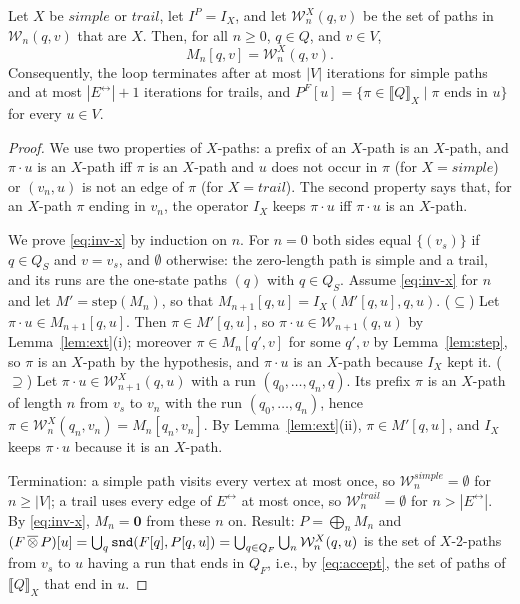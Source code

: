 \begin{theorem}\label{thm:simple-trail}
	Let $X$ be $simple$ or $trail$, let $I^P = I_X$, and let $\mathcal{W}^X_n(q, v)$ be the set of paths in $\mathcal{W}_n(q, v)$ that are $X$. Then, for all $n \geq 0$, $q \in Q$, and $v \in V$,
	\begin{equation}\label{eq:inv-x}
		M_n[q, v] = \mathcal{W}^X_n(q, v).
	\end{equation}
	Consequently, the loop terminates after at most $|V|$ iterations for simple paths and at most $|E^\leftrightarrow| + 1$ iterations for trails, and $P^F[u] = \{ \pi \in \llbracket Q \rrbracket_X \mid \pi \text{ ends in } u \}$ for every $u \in V$.
\end{theorem}
\begin{proof}
	We use two properties of $X$-paths: a prefix of an $X$-path is an $X$-path, and $\pi \cdot u$ is an $X$-path iff $\pi$ is an $X$-path and $u$ does not occur in $\pi$ (for $X = simple$) or $(v_n, u)$ is not an edge of $\pi$ (for $X = trail$).
	The second property says that, for an $X$-path $\pi$ ending in $v_n$, the operator $I_X$ keeps $\pi \cdot u$ iff $\pi \cdot u$ is an $X$-path.

	We prove \eqref{eq:inv-x} by induction on $n$.
	For $n = 0$ both sides equal $\{ (v_s) \}$ if $q \in Q_S$ and $v = v_s$, and $\emptyset$ otherwise: the zero-length path is simple and a trail, and its runs are the one-state paths $(q)$ with $q \in Q_S$.
	Assume \eqref{eq:inv-x} for $n$ and let $M' = \mathrm{step}(M_n)$, so that $M_{n+1}[q, u] = I_X(M'[q, u], q, u)$.
	($\subseteq$) Let $\pi \cdot u \in M_{n+1}[q, u]$. Then $\pi \in M'[q, u]$, so $\pi \cdot u \in \mathcal{W}_{n+1}(q, u)$ by Lemma~\ref{lem:ext}(i); moreover $\pi \in M_n[q', v]$ for some $q', v$ by Lemma~\ref{lem:step}, so $\pi$ is an $X$-path by the hypothesis, and $\pi \cdot u$ is an $X$-path because $I_X$ kept it.
	($\supseteq$) Let $\pi \cdot u \in \mathcal{W}^X_{n+1}(q, u)$ with a run $(q_0, \ldots, q_n, q)$. Its prefix $\pi$ is an $X$-path of length $n$ from $v_s$ to $v_n$ with the run $(q_0, \ldots, q_n)$, hence $\pi \in \mathcal{W}^X_n(q_n, v_n) = M_n[q_n, v_n]$. By Lemma~\ref{lem:ext}(ii), $\pi \in M'[q, u]$, and $I_X$ keeps $\pi \cdot u$ because it is an $X$-path.

	Termination: a simple path visits every vertex at most once, so $\mathcal{W}^{simple}_n = \emptyset$ for $n \geq |V|$; a trail uses every edge of $E^\leftrightarrow$ at most once, so $\mathcal{W}^{trail}_n = \emptyset$ for $n > |E^\leftrightarrow|$. By \eqref{eq:inv-x}, $M_n = \mathbf{0}$ from these $n$ on.
	Result: $P = \bigoplus_n M_n$ and $(F \,\overline{\otimes}\, P)[u] = \bigcup_q \texttt{snd}(F[q], P[q, u]) = \bigcup_{q \in Q_F} \bigcup_n \mathcal{W}^X_n(q, u)$ is the set of $X$-2-paths from $v_s$ to $u$ having a run that ends in $Q_F$, i.e., by \eqref{eq:accept}, the set of paths of $\llbracket Q \rrbracket_X$ that end in $u$.
\end{proof}

